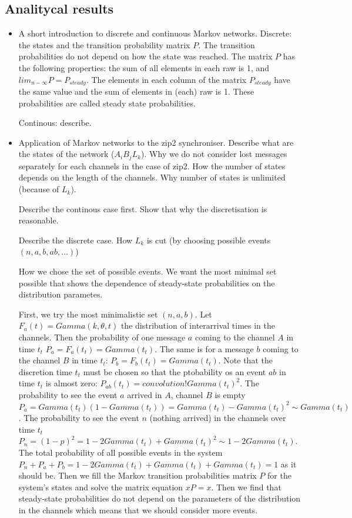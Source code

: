   \subsection{Analitycal results}
    \begin{itemize}
    \item A short introduction to discrete and continuous Markov networks.
Discrete: the states and the transition probability matrix $P$. The transition probabilities do not depend on how the state was reached. The matrix $P$ has the following properties: the sum of all elements in each raw is 1, and $lim_{n - \infty} P = P_{steady}$. The elements in each column of the matrix $P_{steady}$ have the same value and the sum of elements in (each) raw is 1. These probabilities are called steady state probabilities.

Continous: describe.
    \item Application of Markov networks to the zip2 synchroniser.
Describe what are the states of the network ($A_{i} B_{j} L_{k}$). Why we do not consider lost messages separately for each channels in the case of zip2. How the number of states depends on the length of the channels. Why number of states is unlimited (because of $L_{k}$).

Describe the continous case first. Show that why the discretisation is reasonable.

Describe the discrete case. How $L_{k}$ is cut (by choosing possible events $(n,a,b,ab,...)$)

How we chose the set of possible events. We want the most minimal set possible that shows the dependence of steady-state probabilities on the distribution parametes.

First, we try the most minimalistic set $(n,a,b)$. Let $F_{a}(t) = Gamma(k, \theta, t)$ the distribution of interarrival times in the channels. Then the probability of one message $a$ coming to the channel $A$ in time $t_{t}$ $P_{a} = F_{a}(t_{t}) = Gamma(t_{t})$. The same is for a message $b$ coming to the channel $B$ in time $t_{t}$: $P_{b} = F_{b}(t_{t}) = Gamma(t_{t})$. Note that the discretion time $t_{t}$ must be chosen so that the ptobability os an event $ab$ in time $t_{t}$ is almost zero: $P_{ab}(t_{t}) = convolution! Gamma(t_{t})^2$. The probability to see the event $a$ arrived in $A$, channel $B$ is empty $P_{a} = Gamma(t_{t})(1-Gamma(t_{t})) = Gamma(t_{t}) - Gamma(t_{t})^2 \sim Gamma(t_{t})$. The probability to see the event $n$ (nothing arrived) in the channels over time $t_{t}$ $P_{n} = (1-p)^2 = 1 - 2 Gamma(t_{t}) + Gamma(t_{t})^2 \sim 1 - 2 Gamma(t_{t})$. The total probability of all possible events in the system $P_{n} + P_{a} + P_{b} = 1 - 2 Gamma(t_{t}) + Gamma(t_{t}) + Gamma(t_{t}) = 1$ as it should be. Then we fill the Markov transition probabilities matrix $P$ for the system's states and solve the matrix equation $xP = x$. Then we find that steady-state probabilities do not depend on the parameters of the distribution in the channels which means that we should consider more events.


\end{itemize}
